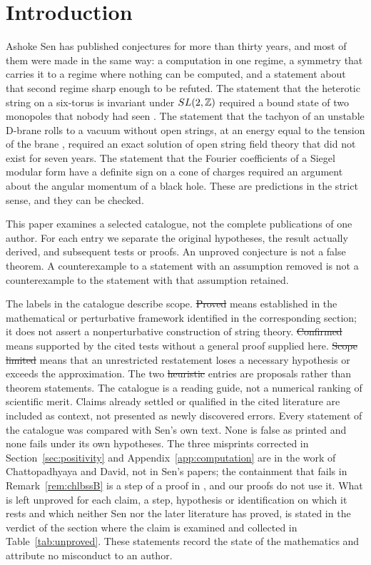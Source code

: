 \section{Introduction}\label{sec:intro}

Ashoke Sen has published conjectures for more than thirty years, and most of them were made in the same way: a computation in one regime, a symmetry that carries it to a regime where nothing can be computed, and a statement about that second regime sharp enough to be refuted. The statement that the heterotic string on a six-torus is invariant under $SL(2,\mathbb{Z})$ required a bound state of two monopoles that nobody had seen \cite{Sen94duality,Sen94dyon}. The statement that the tachyon of an unstable D-brane rolls to a vacuum without open strings, at an energy equal to the tension of the brane \cite{Sen98bab,Sen99univ}, required an exact solution of open string field theory that did not exist for seven years. The statement that the Fourier coefficients of a Siegel modular form have a definite sign on a cone of charges \cite{Sen11positivity} required an argument about the angular momentum of a black hole. These are predictions in the strict sense, and they can be checked.

This paper examines a selected catalogue, not the complete publications of one author. For each entry we separate the original hypotheses, the result actually derived, and subsequent tests or proofs. An unproved conjecture is not a false theorem. A counterexample to a statement with an assumption removed is not a counterexample to the statement with that assumption retained.

The labels in the catalogue describe scope. \st{Proved} means established in the mathematical or perturbative framework identified in the corresponding section; it does not assert a nonperturbative construction of string theory. \st{Confirmed} means supported by the cited tests without a general proof supplied here. \st{Scope limited} means that an unrestricted restatement loses a necessary hypothesis or exceeds the approximation. The two \st{heuristic} entries are proposals rather than theorem statements. The catalogue is a reading guide, not a numerical ranking of scientific merit. Claims already settled or qualified in the cited literature are included as context, not presented as newly discovered errors. Every statement of the catalogue was compared with Sen's own text. None is false as printed and none fails under its own hypotheses. The three misprints corrected in Section~\ref{sec:positivity} and Appendix~\ref{app:computation} are in the work of Chattopadhyaya and David, not in Sen's papers; the containment that fails in Remark~\ref{rem:chlbssB} is a step of a proof in \cite{BSS25}, and our proofs do not use it. What is left unproved for each claim, a step, hypothesis or identification on which it rests and which neither Sen nor the later literature has proved, is stated in the verdict of the section where the claim is examined and collected in Table~\ref{tab:unproved}. These statements record the state of the mathematics and attribute no misconduct to an author.

